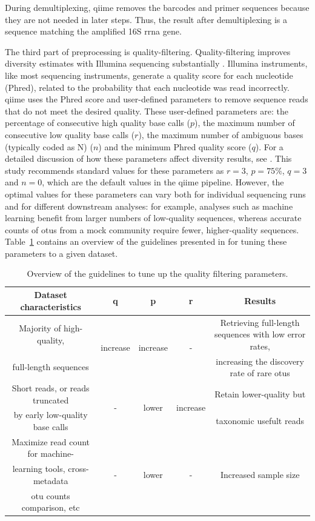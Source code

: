 During demultiplexing, \gls{qiime} removes the barcodes and primer sequences because they are not needed
in later steps. Thus, the result after demultiplexing is a sequence matching the amplified 16S \gls{rrna} gene.

The third part of preprocessing is quality-filtering. Quality-filtering improves diversity estimates with
Illumina sequencing substantially \cite{Bokulich2013}. Illumina instruments, like most sequencing instruments,
generate a quality score for each nucleotide (Phred), related to the probability that each nucleotide was
read incorrectly. \gls{qiime} uses the Phred score and user-defined parameters to remove sequence reads
that do not meet the desired quality. These user-defined parameters are: the percentage of consecutive
high quality base calls ($p$), the maximum number of consecutive low quality base calls ($r$), the
maximum number of ambiguous bases (typically coded as N) ($n$) and the minimum Phred quality score ($q$).
For a detailed discussion of how these parameters affect diversity results, see \cite{Bokulich2013}.
This study recommends standard values for these parameters as $r = 3$, $p = 75\%$, $q = 3$ and $n = 0$,
which are the default values in the \gls{qiime} pipeline. However, the optimal values for these parameters
can vary both for individual sequencing runs and for different downstream analyses: for example,
analyses such as machine learning benefit from larger numbers of low-quality sequences, whereas accurate
counts of \gls{otu}s from a mock community require fewer, higher-quality sequences. Table~\ref{btable1} contains
an overview of the guidelines presented in \cite{Bokulich2013} for tuning these parameters to a given dataset.


\begin{table}
\centering
\caption[Overview of the guidelines to tune up the quality filtering parameters (adapted from \cite{Bokulich2013})]{Overview of the guidelines to tune up the quality filtering parameters.}\label{btable1}
\begin{tabular*}{\textwidth}{ccccc}
\toprule
Dataset characteristics & q & p & r & Results\\
\midrule
Majority of high-quality, & \multirow{2}{*}{increase} & \multirow{2}{*}{increase} & \multirow{2}{*}{-} & Retrieving full-length sequences with low error rates,\\
full-length sequences & & & & increasing the discovery rate of rare \gls{otu}s\\
\midrule
Short reads, or reads truncated & \multirow{2}{*}{-} & \multirow{2}{*}{lower} & \multirow{2}{*}{increase} & Retain lower-quality but\\
by early low-quality base calls & & & & taxonomic usefult reads\\
\midrule
Maximize read count for machine- & \multirow{3}{*}{-} & \multirow{3}{*}{lower} & \multirow{3}{*}{-} & \multirow{3}{*}{Increased sample size}\\
learning tools, cross-metadata & & & & \\
\gls{otu} counts comparison, etc & & & & \\
\bottomrule
\end{tabular*}
\end{table}

